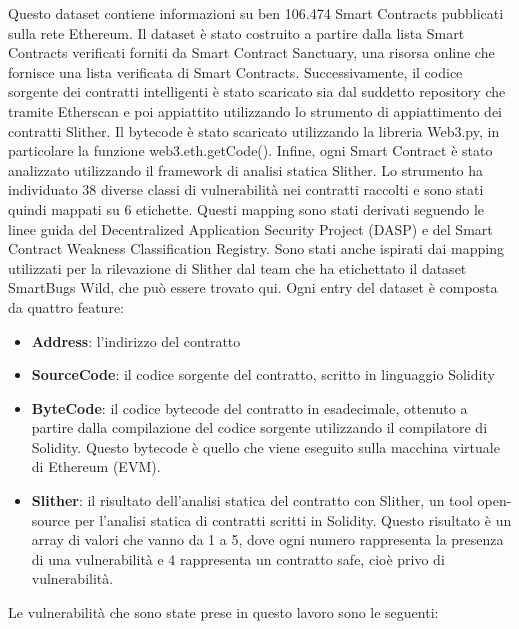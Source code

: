 \documentclass[../../Thesis.tex]{subfiles}
\begin{document}
Questo dataset contiene informazioni su ben 106.474 Smart Contracts pubblicati sulla rete Ethereum. Il dataset è stato costruito a partire dalla lista Smart Contracts verificati forniti da Smart Contract Sanctuary, una risorsa online che fornisce una lista verificata di Smart Contracts. Successivamente, il codice sorgente dei contratti intelligenti è stato scaricato sia dal suddetto repository che tramite Etherscan e poi appiattito utilizzando lo strumento di appiattimento dei contratti Slither. Il bytecode è stato scaricato utilizzando la libreria Web3.py, in particolare la funzione web3.eth.getCode(). Infine, ogni Smart Contract è stato analizzato utilizzando il framework di analisi statica Slither. Lo strumento ha individuato 38 diverse classi di vulnerabilità nei contratti raccolti e sono stati quindi mappati su 6 etichette. Questi mapping sono stati derivati seguendo le linee guida del Decentralized Application Security Project (DASP) e del Smart Contract Weakness Classification Registry. Sono stati anche ispirati dai mapping utilizzati per la rilevazione di Slither dal team che ha etichettato il dataset SmartBugs Wild, che può essere trovato qui. Ogni entry del dataset è composta da quattro feature:
\begin{itemize}
    \item  \textbf{Address}: l'indirizzo del contratto
    \item  \textbf{SourceCode}: il codice sorgente del contratto, scritto in linguaggio Solidity
    \item  \textbf{ByteCode}: il codice bytecode del contratto in esadecimale, ottenuto a partire dalla compilazione del codice sorgente utilizzando il compilatore di Solidity. Questo bytecode è quello che viene eseguito sulla macchina virtuale di Ethereum (EVM).
    \item  \textbf{Slither}: il risultato dell'analisi statica del contratto con Slither, un tool open-source per l'analisi statica di contratti scritti in Solidity. Questo risultato è un array di valori che vanno da 1 a 5, dove ogni numero  rappresenta la presenza di una vulnerabilità e 4 rappresenta un contratto safe, cioè privo di vulnerabilità.
\end{itemize}
Le vulnerabilità che sono state prese in questo lavoro sono le seguenti:
\end{document}
